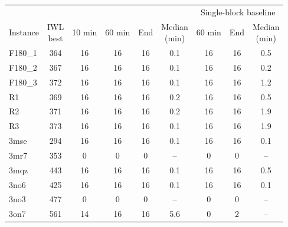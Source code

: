 \begin{tabular}{@{}lcccccccc@{}}
\toprule
& & \multicolumn{4}{c}{\method{}} & \multicolumn{3}{c}{Single-block baseline} \\
\cmidrule(lr){3-6}\cmidrule(l){7-9}
Instance & \shortstack{IWL\\best} & 10 min & 60 min & End & \shortstack{Median\\(min)} & 60 min & End & \shortstack{Median\\(min)} \\
\midrule
F180\_1 & 364 & 16 & 16 & 16 & 0.1 & 16 & 16 & 0.5 \\
F180\_2 & 367 & 16 & 16 & 16 & 0.1 & 16 & 16 & 0.2 \\
F180\_3 & 372 & 16 & 16 & 16 & 0.1 & 16 & 16 & 1.2 \\
R1 & 369 & 16 & 16 & 16 & 0.2 & 16 & 16 & 0.5 \\
R2 & 371 & 16 & 16 & 16 & 0.2 & 16 & 16 & 1.9 \\
R3 & 373 & 16 & 16 & 16 & 0.1 & 16 & 16 & 1.9 \\
3mse & 294 & 16 & 16 & 16 & 0.1 & 16 & 16 & 0.1 \\
3mr7 & 353 & 0 & 0 & 0 & -- & 0 & 0 & -- \\
3mqz & 443 & 16 & 16 & 16 & 0.1 & 16 & 16 & 0.5 \\
3no6 & 425 & 16 & 16 & 16 & 0.1 & 16 & 16 & 0.1 \\
3no3 & 477 & 0 & 0 & 0 & -- & 0 & 0 & -- \\
3on7 & 561 & 14 & 16 & 16 & 5.6 & 0 & 2 & -- \\
\bottomrule
\end{tabular}
